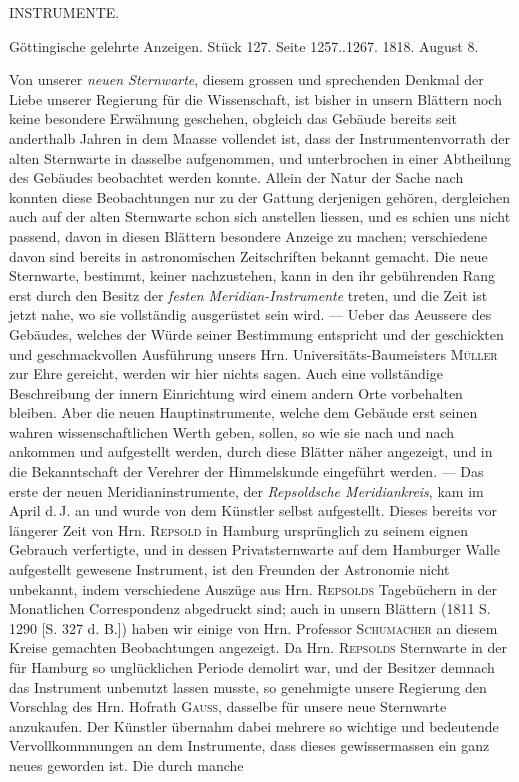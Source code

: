 \clearpage
{}
\begin{center}
\Large INSTRUMENTE.
\end{center}

\begin{center}
Göttingische gelehrte Anzeigen. Stück 127. Seite 1257..1267. 1818. August 8.
\end{center}

\par\indent Von unserer \emph{neuen Sternwarte}, diesem grossen und sprechenden Denkmal der Liebe unserer Regierung für die Wissenschaft, ist bisher in unsern Blättern noch keine besondere Erwähnung geschehen, obgleich das Gebäude bereits seit anderthalb Jahren in dem Maasse vollendet ist, dass der Instrumentenvorrath der alten Sternwarte in dasselbe aufgenommen, und unterbrochen in einer Abtheilung des Gebäudes beobachtet werden konnte. Allein der Natur der Sache nach konnten diese Beobachtungen nur zu der Gattung derjenigen gehören, dergleichen auch auf der alten Sternwarte schon sich anstellen liessen, und es schien uns nicht passend, davon in diesen Blättern besondere Anzeige zu machen; verschiedene davon sind bereits in astronomischen Zeitschriften bekannt gemacht. Die neue Sternwarte, bestimmt, keiner nachzustehen, kann in den ihr gebührenden Rang erst durch den Besitz der \emph{festen Meridian-Instrumente} treten, und die Zeit ist jetzt nahe, wo sie vollständig ausgerüstet sein wird. --- Ueber das Aeussere des Gebäudes, welches der Würde seiner Bestimmung entspricht und der geschickten und geschmackvollen Ausführung unsers Hrn. Universitäts-Baumeisters \textsc{Müller} zur Ehre gereicht, werden wir hier nichts sagen. Auch eine vollständige Beschreibung der innern Einrichtung wird einem andern Orte vorbehalten bleiben. Aber die neuen Hauptinstrumente, welche dem Gebäude erst seinen wahren wissenschaftlichen Werth geben, sollen, so wie sie nach und nach ankommen und aufgestellt werden, durch diese Blätter näher angezeigt, und in die Bekanntschaft der Verehrer der Himmelskunde eingeführt werden. --- Das erste der neuen Meridianinstrumente, der \emph{Repsoldsche Meridiankreis}, kam im April d.\,J. an und wurde von dem Künstler selbst aufgestellt. Dieses bereits vor längerer Zeit von Hrn. \textsc{Repsold} in Hamburg ursprünglich zu seinem eignen Gebrauch verfertigte, und in dessen Privatsternwarte auf dem Hamburger Walle aufgestellt gewesene Instrument, ist den Freunden der Astronomie nicht unbekannt, indem verschiedene Auszüge aus Hrn. \textsc{Repsolds} Tagebüchern in der Monatlichen Correspondenz abgedruckt sind; auch in unsern Blättern (1811 S. 1290 [S. 327 d. B.]) haben wir einige von Hrn. Professor \textsc{Schumacher} an diesem Kreise gemachten Beobachtungen angezeigt. Da Hrn. \textsc{Repsolds} Sternwarte in der für Hamburg so unglücklichen Periode demolirt war, und der Besitzer demnach das Instrument unbenutzt lassen musste, so genehmigte unsere Regierung den Vorschlag des Hrn. Hofrath \textsc{Gauss}, dasselbe für unsere neue Sternwarte anzukaufen. Der Künstler übernahm dabei mehrere so wichtige und bedeutende Vervollkommnungen an dem Instrumente, dass dieses gewissermassen ein ganz neues geworden ist. Die durch manche 